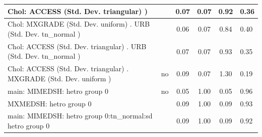 \begin{table}
\begin{center}
\begin{tabular}{|l|l|c|c|c|l|}
			\hline
			 Chol: ACCESS (Std. Dev. triangular) ) &  & 0.07 & 0.07 & 0.92 & 0.36 \\
			\hline
			 Chol: MXGRADE (Std. Dev. uniform) . URB (Std. Dev.   tn_normal ) &  & 0.06 & 0.07 & 0.84 & 0.40 \\
			\hline
			 Chol: ACCESS (Std. Dev. triangular) . URB (Std. Dev.   tn_normal ) &  & 0.07 & 0.07 & 0.93 & 0.35 \\
			\hline
			 Chol: ACCESS (Std. Dev. triangular) . MXGRADE (Std. Dev.   uniform ) & no & 0.09 & 0.07 & 1.30 & 0.19 \\
			\hline
			main: MIMEDSH: hetro group 0 & no & 0.05 & 1.00 & 0.05 & 0.96 \\
			\hline
			MXMEDSH: hetro group 0 &  & 0.09 & 1.00 & 0.09 & 0.93 \\
			\hline
			main: MIMEDSH: hetro group 0:tn_normal:sd  hetro group 0 &  & 0.09 & 1.00 & 0.09 & 0.92 \\
			\hline
		\end{tabular}
	\end{center}
\end{table}